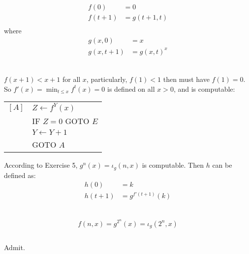 \subsection{}
\begin{align*}
  f(0)   & = 0 \\
  f(t+1) & = g(t+1, t) \\
\end{align*}
where
\begin{align*}
  g(x, 0)   & = x \\
  g(x, t+1) & = {g(x, t)}^{x} \\
\end{align*}


\subsection{}
$ f(x+1) < x+1 $ for all $x$, particularly, $ f(1) < 1 $ then must have
 $ f(1) = 0 $. So $ f'(x) = \min _{t\le x} f^{t}(x) = 0 $ is defined on
all $ x>0 $, and is computable:
\begin{center}
\begin{tabular}{ll}
  $[A]$ & $ Z \gets f^{Y}(x) $ \\
        & IF $Z = 0$ GOTO $E$ \\
        & $ Y \gets Y + 1 $ \\
        & GOTO $A$
\end{tabular}
\end{center}
According to Exercise 5, $ g^{n}(x) = \iota_{g}(n, x) $ is computable.
Then $h$ can be defined as:
\begin{align*}
  h(0)   & = k \\
  h(t+1) & = g^{f'(t+1)}(k) \\
\end{align*}


\subsection{}
\[ f(n, x) = g^{2^{n}}(x) = \iota_{g}(2^{n}, x) \]

\subsection{}
Admit.

